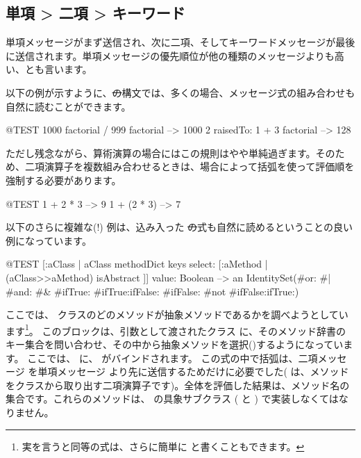 \documentclass[a4paper,10pt,twoside]{book}
\begin{document}
\subsection*{単項 > 二項 > キーワード}
単項メッセージがまず送信され、次に二項、そしてキーワードメッセージが最後に送信されます。単項メッセージの優先順位が他の種類のメッセージよりも高い、とも言います。


以下の例が示すように、\st の構文では、多くの場合、メッセージ式の組み合わせも自然に読むことができます。
\begin{code}{@TEST}
1000 factorial / 999 factorial --> 1000
2 raisedTo: 1 + 3 factorial     --> 128
\end{code}
\noindent

ただし残念ながら、算術演算の場合にはこの規則はやや単純過ぎます。そのため、二項演算子を複数組み合わせるときは、場合によって括弧を使って評価順を強制する必要があります。
\begin{code}{@TEST}
1 + 2 * 3   --> 9
1 + (2 * 3) --> 7
\end{code}

以下のさらに複雑な(!) 例は、込み入った \st の式も自然に読めるということの良い例になっています。
\begin{code}{@TEST}
[:aClass | aClass methodDict keys select: [:aMethod | (aClass>>aMethod) isAbstract ]] value: Boolean --> an IdentitySet(#or: #| #and: #& #ifTrue: #ifTrue:ifFalse: #ifFalse: #not #ifFalse:ifTrue:)
\end{code}
\noindent
ここでは、 クラスのどのメソッドが抽象メソッドであるかを調べようとしています\footnote{実を言うと同等の式は、さらに簡単に  と書くこともできます。}。
このブロックは、引数として渡されたクラス  に、そのメソッド辞書のキー集合を問い合わせ、その中から抽象メソッドを選択()するようになっています。
ここでは、 に、 がバインドされます。
この式の中で括弧は、二項メッセージ \ct{>>} を単項メッセージ \mbox{} より先に送信するためだけに必要でした(\ct{>>} は、メソッドをクラスから取り出す二項演算子です)。全体を評価した結果は、メソッド名の集合です。これらのメソッドは、 の具象サブクラス ( と ) で実装しなくてはなりません。
\end{document}
